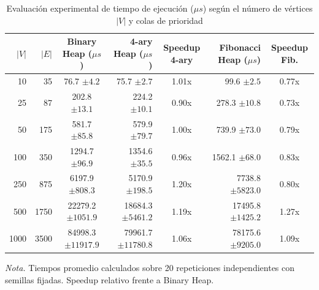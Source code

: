 \begin{table}[H]
    \centering
    \fontsize{10}{12.5}\selectfont
    \setlength{\tabcolsep}{2pt}
    \caption{Evaluación experimental de tiempo de ejecución ($\mu s$) según el número de vértices $|V|$ y colas de prioridad}
    \label{tab:benchmark_escalabilidad}
    \begin{tabular*}{\textwidth}{@{\extracolsep{\fill}}rrcrcrc@{}}
        \toprule
        \textbf{$|V|$} & \textbf{$|E|$} & \textbf{Binary Heap ($\mu s$)} & \textbf{4-ary Heap ($\mu s$)} & \textbf{Speedup 4-ary} & \textbf{Fibonacci Heap ($\mu s$)} & \textbf{Speedup Fib.} \\
        \midrule
        10 & 35 & 76.7 $\pm 4.2$ & 75.7 $\pm 2.7$ & 1.01x & 99.6 $\pm 2.5$ & 0.77x \\
        25 & 87 & 202.8 $\pm 13.1$ & 224.2 $\pm 10.1$ & 0.90x & 278.3 $\pm 10.8$ & 0.73x \\
        50 & 175 & 581.7 $\pm 85.8$ & 579.9 $\pm 79.7$ & 1.00x & 739.9 $\pm 73.0$ & 0.79x \\
        100 & 350 & 1294.7 $\pm 96.9$ & 1354.6 $\pm 35.5$ & 0.96x & 1562.1 $\pm 68.0$ & 0.83x \\
        250 & 875 & 6197.9 $\pm 808.3$ & 5170.9 $\pm 198.5$ & 1.20x & 7738.8 $\pm 5823.0$ & 0.80x \\
        500 & 1750 & 22279.2 $\pm 1051.9$ & 18684.3 $\pm 5461.2$ & 1.19x & 17495.8 $\pm 1425.2$ & 1.27x \\
        1000 & 3500 & 84998.3 $\pm 11917.9$ & 79961.7 $\pm 11780.8$ & 1.06x & 78175.6 $\pm 9205.0$ & 1.09x \\
        \bottomrule
    \end{tabular*}
    \vspace{0.15cm}
    \raggedright
    \textit{Nota.} Tiempos promedio calculados sobre 20 repeticiones independientes con semillas fijadas. Speedup relativo frente a Binary Heap.
\end{table}
